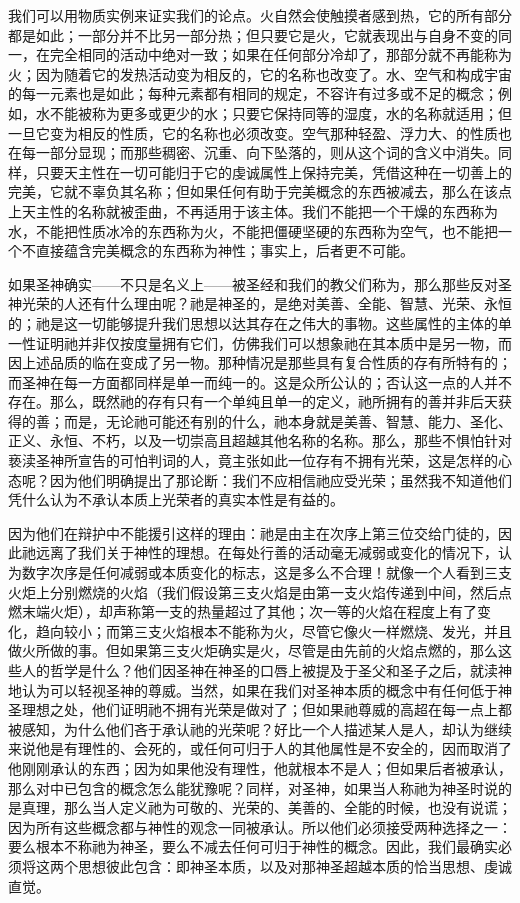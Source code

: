 我们可以用物质实例来证实我们的论点。火自然会使触摸者感到热，它的所有部分都是如此；一部分并不比另一部分热；但只要它是火，它就表现出与自身不变的同一，在完全相同的活动中绝对一致；如果在任何部分冷却了，那部分就不再能称为火；因为随着它的发热活动变为相反的，它的名称也改变了。水、空气和构成宇宙的每一元素也是如此；每种元素都有相同的规定，不容许有过多或不足的概念；例如，水不能被称为更多或更少的水；只要它保持同等的湿度，水的名称就适用；但一旦它变为相反的性质，它的名称也必须改变。空气那种轻盈、浮力大、的性质也在每一部分显现；而那些稠密、沉重、向下坠落的，则从这个词的含义中消失。同样，只要天主性在一切可能归于它的虔诚属性上保持完美，凭借这种在一切善上的完美，它就不辜负其名称；但如果任何有助于完美概念的东西被减去，那么在该点上天主性的名称就被歪曲，不再适用于该主体。我们不能把一个干燥的东西称为水，不能把性质冰冷的东西称为火，不能把僵硬坚硬的东西称为空气，也不能把一个不直接蕴含完美概念的东西称为神性；事实上，后者更不可能。\par

如果圣神确实——不只是名义上——被圣经和我们的教父们称为，那么那些反对圣神光荣的人还有什么理由呢？祂是神圣的，是绝对美善、全能、智慧、光荣、永恒的；祂是这一切能够提升我们思想以达其存在之伟大的事物。这些属性的主体的单一性证明祂并非仅按度量拥有它们，仿佛我们可以想象祂在其本质中是另一物，而因上述品质的临在变成了另一物。那种情况是那些具有复合性质的存有所特有的；而圣神在每一方面都同样是单一而纯一的。这是众所公认的；否认这一点的人并不存在。那么，既然祂的存有只有一个单纯且单一的定义，祂所拥有的善并非后天获得的善；而是，无论祂可能还有别的什么，祂本身就是美善、智慧、能力、圣化、正义、永恒、不朽，以及一切崇高且超越其他名称的名称。那么，那些不惧怕针对亵渎圣神所宣告的可怕判词的人，竟主张如此一位存有不拥有光荣，这是怎样的心态呢？因为他们明确提出了那论断：我们不应相信祂应受光荣；虽然我不知道他们凭什么认为不承认本质上光荣者的真实本性是有益的。\par

因为他们在辩护中不能援引这样的理由：祂是由主在次序上第三位交给门徒的，因此祂远离了我们关于神性的理想。在每处行善的活动毫无减弱或变化的情况下，认为数字次序是任何减弱或本质变化的标志，这是多么不合理！就像一个人看到三支火炬上分别燃烧的火焰（我们假设第三支火焰是由第一支火焰传递到中间，然后点燃末端火炬），却声称第一支的热量超过了其他；次一等的火焰在程度上有了变化，趋向较小；而第三支火焰根本不能称为火，尽管它像火一样燃烧、发光，并且做火所做的事。但如果第三支火炬确实是火，尽管是由先前的火焰点燃的，那么这些人的哲学是什么？他们因圣神在神圣的口唇上被提及于圣父和圣子之后，就渎神地认为可以轻视圣神的尊威。当然，如果在我们对圣神本质的概念中有任何低于神圣理想之处，他们证明祂不拥有光荣是做对了；但如果祂尊威的高超在每一点上都被感知，为什么他们吝于承认祂的光荣呢？好比一个人描述某人是人，却认为继续来说他是有理性的、会死的，或任何可归于人的其他属性是不安全的，因而取消了他刚刚承认的东西；因为如果他没有理性，他就根本不是人；但如果后者被承认，那么对中已包含的概念怎么能犹豫呢？同样，对圣神，如果当人称祂为神圣时说的是真理，那么当人定义祂为可敬的、光荣的、美善的、全能的时候，也没有说谎；因为所有这些概念都与神性的观念一同被承认。所以他们必须接受两种选择之一：要么根本不称祂为神圣，要么不减去任何可归于神性的概念。因此，我们最确实必须将这两个思想彼此包含：即神圣本质，以及对那神圣超越本质的恰当思想、虔诚直觉。\par

